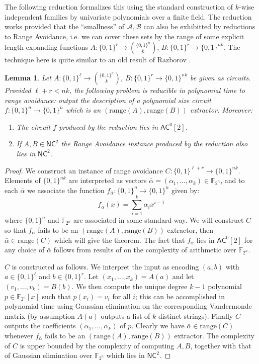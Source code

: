 \documentclass[11pt]{article}
\newtheorem{lemma}{Lemma}
\newcommand{\B}{\{0,1\}}
\newcommand{\rng}{\mathrm{range}}
\begin{document}
The following reduction formalizes this using the standard construction of $k$-wise independent families by univariate polynomials over a finite field. The reduction works provided that the ``smallness'' of $\mathcal{A}, \mathcal{B}$ can also be exhibitted by reductions to Range Avoidance, i.e. we can cover these sets by the range of some explicit length-expanding functions $A: \B^{\ell} \to \binom{\B^n}{k}$, $B: \B^{r} \to \B^{nk}$. The technique here is quite similar to an old result of Razborov \cite{razborov}. 
\begin{lemma}
Let $A: \B^{\ell} \to \binom{\B^n}{k}$, $B: \B^{r} \to \B^{nk}$ be given as circuits. Provided $\ell + r < nk$, the following problem is reducible in polynomial time to range avoidance: output the description of a polynomial size circuit $f: \B^n \to \B^n$ which is an $(\rng(A), \rng(B))$ extractor. Moreover:
\begin{enumerate}
	\item The circuit $f$ produced by the reduction lies in $\mathsf{AC}^0[2]$.
	\item If $A, B \in \mathsf{NC}^2$ the Range Avoidance instance produced by the reduction also lies in $\mathsf{NC}^2$.
\end{enumerate} 
\end{lemma}
\begin{proof}
We construct an instance of range avoidance $C: \B^{\ell + r} \to \B^{nk}$. Elements of $\B^{nk}$ are interpreted as vectors $\bar{\alpha}=(\alpha_1,\ldots,\alpha_k) \in \mathbb{F}_{2^n}$, and to each $\bar{\alpha}$ we associate the function $f_{\bar{\alpha}}: \B^n\to \B^n$ given by:
\[
f_{\bar{\alpha}}(x) = \sum_{i = 1}^k \alpha_i x^{i-1}
\]
where $\B^n$ and $\mathbb{F}_{2^n}$ are associated in some standard way. We will construct $C$ so that $f_{\alpha}$ fails to be an $(\rng(A),\rng(B))$ extractor, then $\bar{\alpha} \in \rng(C)$ which will give the theorem. The fact that $f_{\bar{\alpha}}$ lies in $\mathsf{AC}^0[2]$ for any choice of $\bar{\alpha}$ follows from results of \cite{finite-field} on the complexity of arithmetic over $\mathbb{F}_{2^n}$.

$C$ is constructed as follows. We interpret the input as encoding $(a,b)$ with $a \in \B^{\ell}$ and $b \in \B^{r}$. Let $(x_1,\ldots,x_k) = A(a)$ and let $(v_1,\ldots, v_k) = B(b)$. We then compute the unique degree $k-1$ polynomial $p \in \mathbb{F}_{2^n}[x]$ such that $p(x_i)=v_i$ for all $i$; this can be accomplished in polynomial time using Gaussian elimination on the corresponding Vandermonde matrix (by assumption $A(a)$ outputs a list of $k$ distinct strings). Finally $C$ outputs the coefficients $(\alpha_1,\ldots,\alpha_k)$ of $p$. Clearly we have $\bar{\alpha} \in \rng(C)$ whenever $f_{\bar{\alpha}}$ fails to be an $(\rng(A), \rng(B))$ extractor. The complexity of $C$ is upper bounded by the complexity of computing $A,B$, together with that of Gaussian elimination over $\mathbb{F}_{2^n}$ which lies in $\mathsf{NC}^2$.
\end{proof}
\end{document}
